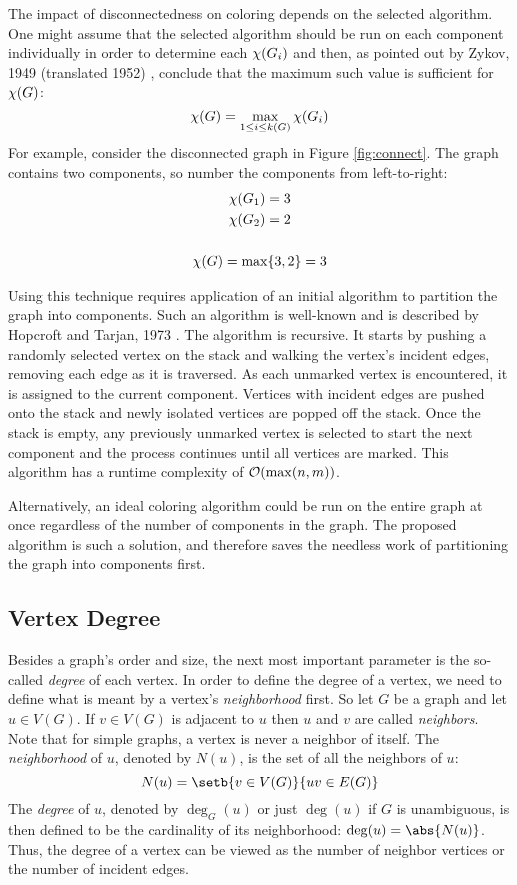 The impact of disconnectedness on coloring depends on the selected algorithm.  One might assume that the selected
algorithm should be run on each component individually in order to determine each \(\chi(G_i)\) and then, as pointed
out by Zykov, 1949 (translated 1952) \cite{zykov}, conclude that the maximum such value is sufficient for \(\chi(G)\):
\[\chi(G)=\max_{1\le i\le k(G)}\chi(G_i)\]
For example, consider the disconnected graph in Figure \ref{fig:connect}.  The graph contains two components, so
number the components from left-to-right:
\begin{gather*}
  \chi(G_1)=3 \\
  \chi(G_2)=2 \\
  \\
  \chi(G)=\max\{3,2\}=3
\end{gather*}

Using this technique requires application of an initial algorithm to partition the graph into components.  Such an
algorithm is well-known and is described by Hopcroft and Tarjan, 1973 \cite{hopcroft}.  The algorithm is recursive.
It starts by pushing a randomly selected vertex on the stack and walking the vertex's incident edges, removing each
edge as it is traversed.  As each unmarked vertex is encountered, it is assigned to the current component.
Vertices with incident edges are pushed onto the stack and newly isolated vertices are popped off the stack.  Once
the stack is empty, any previously unmarked vertex is selected to start the next component and the process
continues until all vertices are marked.  This algorithm has a runtime complexity of \(\mathcal{O}(\max(n,m))\).

Alternatively, an ideal coloring algorithm could be run on the entire graph at once regardless of the number of
components in the graph.  The proposed algorithm is such a solution, and therefore saves the needless work of
partitioning the graph into components first.

\subsection{Vertex Degree}

Besides a graph's order and size, the next most important parameter is the so-called \emph{degree} of each vertex.
In order to define the degree of a vertex, we need to define what is meant by a vertex's \emph{neighborhood} first.
So let \(G\) be a graph and let \(u\in V(G)\).  If \(v\in V(G)\) is adjacent to \(u\) then \(u\) and \(v\) are
called \emph{neighbors}.  Note that for simple graphs, a vertex is never a neighbor of itself.  The
\emph{neighborhood} of \(u\), denoted by \(N(u)\), is the set of all the neighbors of \(u\):
\[N(u)=\setb{v\in V(G)}{uv\in E(G)}\]
The \emph{degree} of \(u\), denoted by \(\deg_G(u)\) or just \(\deg(u)\) if \(G\) is unambiguous, is then defined
to be the cardinality of its neighborhood: \(\deg(u)=\abs{N(u)}\).  Thus, the degree of a vertex can be viewed as
the number of neighbor vertices or the number of incident edges.

